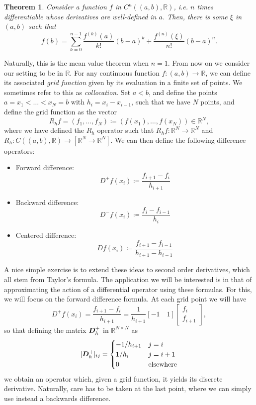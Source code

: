 \documentclass{article}
\newcommand{\mat}{\matrixsym}
\newcommand{\R}{\mathbb{R}}
\newtheorem{theorem}{Theorem}
\begin{document}
\begin{theorem}\label{thm:taylor}
    Consider a function $f$ in $C^n((a,b), \R)$, i.e. $n$ times differentiable whose derivatives are well-defined in $a$. Then, there is some $\xi$ in $(a,b)$ such that
    $$ f(b) = \sum_{k=0}^{n-1}\frac{f^{(k)}(a)}{k!}(b-a)^k + \frac{f^{(n)}(\xi)}{n!}(b-a)^n. $$
\end{theorem}
Naturally, this is the mean value theorem when $n=1$. From now on we consider our setting to be in $\R$. For any continuous function $f:(a,b)\to \R$, we can define its associated \emph{grid function} given by its evaluation in a finite set of points. We sometimes refer to this as \emph{collocation}. Set $a<b$, and define the points $a=x_1<\hdots<x_N=b$ with $h_i=x_{i}-x_{i-1}$, such that we have $N$ points, and define the grid function as the vector
    $$ R_hf = (f_1, \hdots, f_N) \coloneqq (f(x_1), \hdots, f(x_N)) \in \R^N,$$
    where we have defined the $R_h$ operator such that $R_hf:\R^N \to \R^N$ and $R_h:C((a,b),\R)\to [\R^N\to\R^N]$.  We can then define the following difference operators: 
    \begin{itemize}
        \item Forward difference: 
            $$ D^+f(x_i) \coloneqq \frac{f_{i+1} - f_i}{h_{i+1}} $$
        \item Backward difference: 
            $$ D^-f(x_i) \coloneqq \frac{f_{i} - f_{i-1}}{h_{i}} $$
        \item Centered difference:
            $$ Df(x_i) \coloneqq \frac{f_{i+1} - f_{i-1}}{h_{i+1} - h_{i-1}} $$

    \end{itemize}
A nice simple exercise is to extend these ideas to second order derivatives, which all stem from Taylor's formula. The application we will be interested is in that of approximating the action of a differential operator using these formulas. For this, we will focus on the forward difference formula. At each grid point we will have
$$ D^+f(x_i) = \frac{f_{i+1} - f_i}{h_{i+1}} = \frac 1{h_{i+1}} [-1\quad 1]\begin{bmatrix}f_i \\ f_{i+1}\end{bmatrix}, $$
so that defining the matrix $\mat D_h^+$ in $\R^{N\times N}$ as
$$ [\mat D_h^+]_{ij} = \begin{cases} -1/h_{i+1} & j=i \\ 1/h_i  & j=i+1 \\ 0 & \text{elsewhere} \end{cases} $$
we obtain an operator which, given a grid function, it yields its discrete derivative. Naturally, care has to be taken at the last point, where we can simply use instead a backwards difference. 
\end{document}
